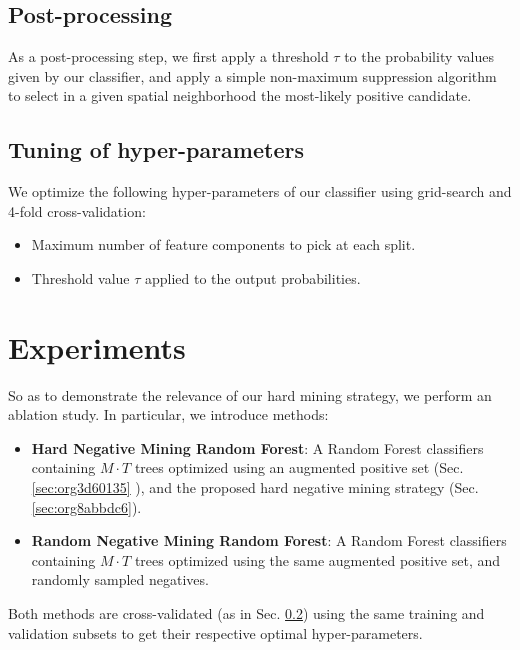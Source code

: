 \documentclass[11pt]{article}
\begin{document}
\subsection{Post-processing}
\label{sec:org3bafff4}

As a post-processing step, we first apply a threshold \(\tau\) to the probability values given
by our classifier,
and apply a simple non-maximum suppression algorithm to select
in a given spatial neighborhood
the most-likely positive candidate.

\subsection{Tuning of hyper-parameters}
\label{sec:org41e4d75}

We optimize the following hyper-parameters of our classifier using grid-search and 4-fold cross-validation:

\begin{itemize}
\item Maximum number of feature components to pick at each split.
\item Threshold value \(\tau\) applied to the output probabilities.
\end{itemize}

\section{Experiments}
\label{sec:org1ff7864}

So as to demonstrate the relevance of our hard mining strategy, we perform an ablation study.
In particular, we introduce methods:

\begin{itemize}
\item \textbf{Hard Negative Mining Random Forest}: A Random Forest classifiers containing \(M \cdot T\) trees
optimized using an augmented positive set (Sec. \ref{sec:org3d60135} ), and the proposed hard negative mining strategy (Sec. \ref{sec:org8abbdc6}).
\item \textbf{Random Negative Mining Random Forest}: A Random Forest classifiers containing \(M \cdot T\) trees
optimized using the same augmented positive set, and randomly sampled negatives.
\end{itemize}

Both methods are cross-validated (as in Sec. \ref{sec:org41e4d75}) using the same training and validation subsets to get their respective
optimal hyper-parameters.
\end{document}
